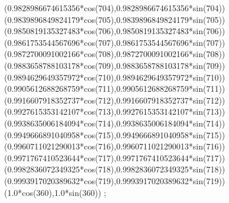 {({0.9828986674615356*cos(704)},{0.9828986674615356*sin(704)})
({0.9839896849824179*cos(705)},{0.9839896849824179*sin(705)})
({0.9850819135327483*cos(706)},{0.9850819135327483*sin(706)})
({0.9861753544567696*cos(707)},{0.9861753544567696*sin(707)})
({0.9872700091002166*cos(708)},{0.9872700091002166*sin(708)})
({0.9883658788103178*cos(709)},{0.9883658788103178*sin(709)})
({0.9894629649357972*cos(710)},{0.9894629649357972*sin(710)})
({0.9905612688268759*cos(711)},{0.9905612688268759*sin(711)})
({0.9916607918352737*cos(712)},{0.9916607918352737*sin(712)})
({0.9927615353142107*cos(713)},{0.9927615353142107*sin(713)})
({0.9938635006184094*cos(714)},{0.9938635006184094*sin(714)})
({0.9949666891040958*cos(715)},{0.9949666891040958*sin(715)})
({0.9960711021290013*cos(716)},{0.9960711021290013*sin(716)})
({0.9971767410523644*cos(717)},{0.9971767410523644*sin(717)})
({0.9982836072349325*cos(718)},{0.9982836072349325*sin(718)})
({0.9993917020389632*cos(719)},{0.9993917020389632*sin(719)})
({1.0*cos(360)},{1.0*sin(360)})
};

